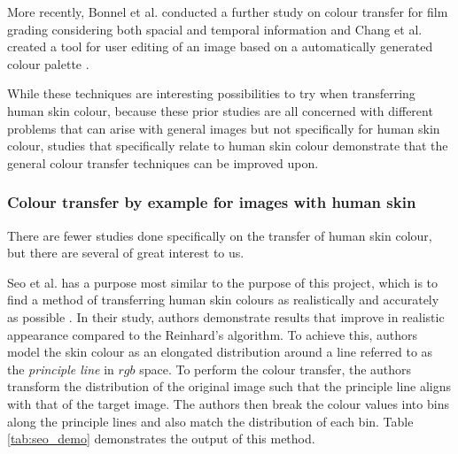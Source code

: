 More recently, Bonnel et al. conducted a further study on colour transfer for film grading considering both spacial and temporal information \cite{bonneel_2013_video} and Chang et al. created a tool for user editing of an image based on a automatically generated colour palette \cite{chang_2015_palette}.

While these techniques are interesting possibilities to try when transferring human skin colour, because these prior studies are all concerned with different problems that can arise with general images but not specifically for human skin colour, studies that specifically relate to human skin colour demonstrate that the general colour transfer techniques can be improved upon.

\subsubsection{Colour transfer by example for images with human skin}
There are fewer studies done specifically on the transfer of human skin colour, but there are several of great interest to us.

Seo et al. has a purpose most similar to the purpose of this project, which is to find a method of transferring human skin colours as realistically and accurately as possible \cite{seo_2005_transfer}. In their study, authors demonstrate results that improve in realistic appearance compared to the Reinhard's algorithm. To achieve this, authors model the skin colour as an elongated distribution around a line referred to as the \textit{principle line} in $rgb$ space. To perform the colour transfer, the authors transform the distribution of the original image such that the principle line aligns with that of the target image. The authors then break the colour values into bins along the principle lines and also match the distribution of each bin. Table \ref{tab:seo_demo} demonstrates the output of this method.


